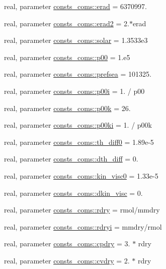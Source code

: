 \begin{DoxyCompactItemize}
real, parameter \hyperlink{namespaceconsts__coms_a359b412a0b4b216f6f33e18264e25f1d}{consts\+\_\+coms\+::erad} = 6370997.
\item 
real, parameter \hyperlink{namespaceconsts__coms_a81a49e39b11ce112f102ddd3dd2c4270}{consts\+\_\+coms\+::erad2} = 2.$\ast$erad
\item 
real, parameter \hyperlink{namespaceconsts__coms_a0f6603824548cc6136bef94ed0686ba1}{consts\+\_\+coms\+::solar} = 1.\+3533e3
\item 
real, parameter \hyperlink{namespaceconsts__coms_a2e56fe1bdb69a647d3bdfd214a331e4a}{consts\+\_\+coms\+::p00} = 1.e5
\item 
real, parameter \hyperlink{namespaceconsts__coms_af9c954288aafec990d48d4e1d52a3754}{consts\+\_\+coms\+::prefsea} = 101325.
\item 
real, parameter \hyperlink{namespaceconsts__coms_aeaba287fa2285b85b6739b70bb76f165}{consts\+\_\+coms\+::p00i} = 1. / p00
\item 
real, parameter \hyperlink{namespaceconsts__coms_ac33b326d1376f1dc4b743c9b7fef5cac}{consts\+\_\+coms\+::p00k} = 26.
\item 
real, parameter \hyperlink{namespaceconsts__coms_a0bae1605acd44e8d9b1719c378b95acc}{consts\+\_\+coms\+::p00ki} = 1. / p00k
\item 
real, parameter \hyperlink{namespaceconsts__coms_a46eedb2769a2f899670b7245a8af4fa5}{consts\+\_\+coms\+::th\+\_\+diff0} = 1.\+89e-\/5
\item 
real, parameter \hyperlink{namespaceconsts__coms_a3e11fe776d94f12ef432f8813a02e384}{consts\+\_\+coms\+::dth\+\_\+diff} = 0.
\item 
real, parameter \hyperlink{namespaceconsts__coms_acff2483efb6558e2a08c463ffc2fe19d}{consts\+\_\+coms\+::kin\+\_\+visc0} = 1.\+33e-\/5
\item 
real, parameter \hyperlink{namespaceconsts__coms_a2599993b07c6660c7d40283df30bf850}{consts\+\_\+coms\+::dkin\+\_\+visc} = 0.
\item 
real, parameter \hyperlink{namespaceconsts__coms_a157c5f522f3f0ee63d28772673cc7584}{consts\+\_\+coms\+::rdry} = rmol/mmdry
\item 
real, parameter \hyperlink{namespaceconsts__coms_a7c5ae815359cb881b6fb6dd1e6cc6b6b}{consts\+\_\+coms\+::rdryi} = mmdry/rmol
\item 
real, parameter \hyperlink{namespaceconsts__coms_a1d31bf978b711e0b276c563e2bed88f0}{consts\+\_\+coms\+::cpdry} = 3. $\ast$ rdry
\item 
real, parameter \hyperlink{namespaceconsts__coms_a7ed4bae72e857ae9a2dcad4061279ad0}{consts\+\_\+coms\+::cvdry} = 2. $\ast$ rdry

\end{DoxyCompactItemize}
